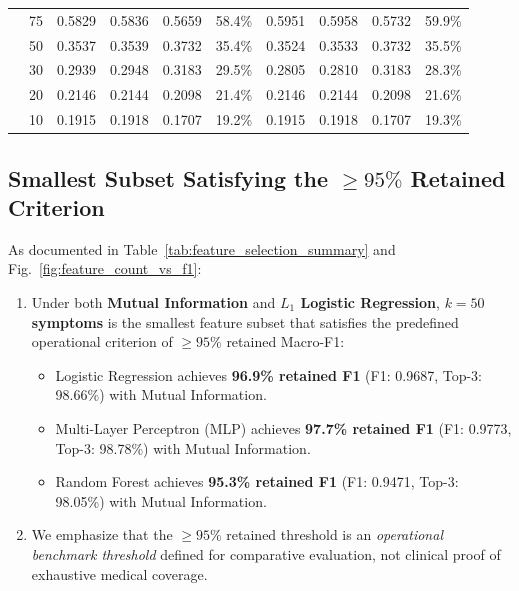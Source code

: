 \begin{table}[!t]
\begin{tabular}{cc|cccc|cccc}
& 75  & 0.5829 & 0.5836 & 0.5659 & 58.4\% & 0.5951 & 0.5958 & 0.5732 & 59.9\% \\
& 50  & 0.3537 & 0.3539 & 0.3732 & 35.4\% & 0.3524 & 0.3533 & 0.3732 & 35.5\% \\
& 30  & 0.2939 & 0.2948 & 0.3183 & 29.5\% & 0.2805 & 0.2810 & 0.3183 & 28.3\% \\
& 20  & 0.2146 & 0.2144 & 0.2098 & 21.4\% & 0.2146 & 0.2144 & 0.2098 & 21.6\% \\
& 10  & 0.1915 & 0.1918 & 0.1707 & 19.2\% & 0.1915 & 0.1918 & 0.1707 & 19.3\% \\
\bottomrule
\end{tabular}
\vspace{2pt}
\par{}
\end{table}

\subsection{Smallest Subset Satisfying the \texorpdfstring{$\ge 95\%$}{>= 95\%} Retained Criterion}
As documented in Table~\ref{tab:feature_selection_summary} and Fig.~\ref{fig:feature_count_vs_f1}:
\begin{enumerate}
    \item Under both \textbf{Mutual Information} and \textbf{$L_1$ Logistic Regression}, \textbf{$k = 50$ symptoms} is the smallest feature subset that satisfies the predefined operational criterion of $\ge 95\%$ retained Macro-F1:
    \begin{itemize}
        \item Logistic Regression achieves \textbf{96.9\% retained F1} (F1: 0.9687, Top-3: 98.66\%) with Mutual Information.
        \item Multi-Layer Perceptron (MLP) achieves \textbf{97.7\% retained F1} (F1: 0.9773, Top-3: 98.78\%) with Mutual Information.
        \item Random Forest achieves \textbf{95.3\% retained F1} (F1: 0.9471, Top-3: 98.05\%) with Mutual Information.
    \end{itemize}
    \item We emphasize that the $\ge 95\%$ retained threshold is an \emph{operational benchmark threshold} defined for comparative evaluation, not clinical proof of exhaustive medical coverage.
\end{enumerate}

